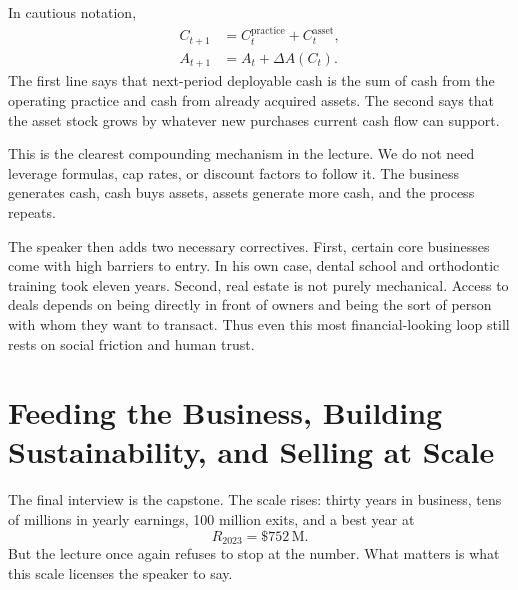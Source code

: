 In cautious notation,
\begin{align}
C_{t+1} &= C_t^{\mathrm{practice}} + C_t^{\mathrm{asset}},\\
A_{t+1} &= A_t + \Delta A(C_t).
\end{align}
The first line says that next-period deployable cash is the sum of cash from the operating practice and cash from already acquired assets. The second says that the asset stock grows by whatever new purchases current cash flow can support.

\begin{figure}[h]
\centering
{}
\end{figure}

This is the clearest compounding mechanism in the lecture. We do not need leverage formulas, cap rates, or discount factors to follow it. The business generates cash, cash buys assets, assets generate more cash, and the process repeats.

The speaker then adds two necessary correctives. First, certain core businesses come with high barriers to entry. In his own case, dental school and orthodontic training took eleven years. Second, real estate is not purely mechanical. Access to deals depends on being directly in front of owners and being the sort of person with whom they want to transact. Thus even this most financial-looking loop still rests on social friction and human trust.

\section{Feeding the Business, Building Sustainability, and Selling at Scale}

The final interview is the capstone. The scale rises: thirty years in business, tens of millions in yearly earnings, \text{\$}100 million exits, and a best year at
\begin{equation}
R_{2023} = \text{\$}752\,\mathrm{M}.
\end{equation}
But the lecture once again refuses to stop at the number. What matters is what this scale licenses the speaker to say.

